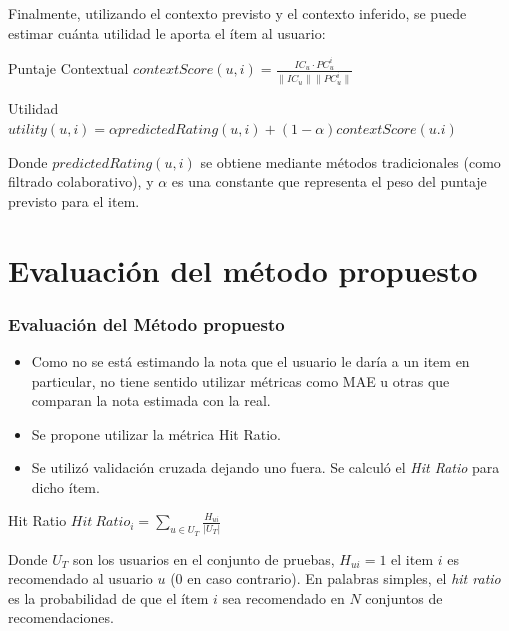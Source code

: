 \documentclass{beamer}
\begin{document}
\begin{frame}
Finalmente, utilizando el contexto previsto y el contexto inferido, se puede estimar cuánta utilidad le aporta el ítem al usuario:

\begin{block}{Puntaje Contextual}
$contextScore(u, i) = \displaystyle \frac{IC_u \cdot PC_u^i}{\|IC_u\|\|PC_u^i\|}$
\end{block}

\begin{block}{Utilidad}
$utility(u, i) = \alpha predictedRating(u, i) + (1 - \alpha) contextScore(u. i)$
\end{block}

Donde $predictedRating(u, i)$ se obtiene mediante métodos tradicionales (como filtrado colaborativo), y $\alpha$ es una constante que representa el peso del puntaje previsto para el item.
\end{frame}


\section{Evaluación del método propuesto}

\begin{frame}
\frametitle{Evaluación del Método propuesto}

\begin{itemize}
\item Como no se está estimando la nota que el usuario le daría a un item en particular, no tiene sentido utilizar métricas como MAE u otras que comparan la nota estimada con la real.
\item Se propone utilizar la métrica Hit Ratio.
\item Se utilizó validación cruzada dejando uno fuera. Se calculó el {\em Hit Ratio} para dicho ítem.
\end{itemize}

\begin{block} {Hit Ratio}
$Hit \ Ratio_i = \sum_{u\in U_T} \displaystyle \frac{H_{ui}}{|U_T|}$
\end{block}

Donde $U_T$ son los usuarios en el conjunto de pruebas, $H_{ui} = 1$ el item $i$ es recomendado al usuario $u$ (0 en caso contrario). En palabras simples, el {\em hit ratio} es la probabilidad de que el ítem $i$ sea recomendado en $N$ conjuntos de recomendaciones.

\end{frame}
\end{document}
